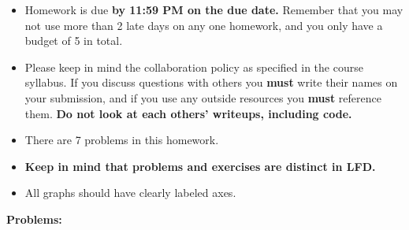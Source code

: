 \documentclass[11pt]{article}
\begin{document}
\begin{itemize}
\item Homework is due \textbf{by 11:59 PM on the due date.} Remember that
  you may not use more than 2 late days on any one homework, and you
  only have a budget of 5 in total.

\item Please keep in mind the collaboration policy as specified in the
  course syllabus. If you discuss questions with 
others you \textbf{must} write their names on your submission, and if
you use any outside resources you \textbf{must} reference
them. \textbf{Do not look at each others' writeups, including code.}

\item There are 7 problems in this homework. 
 \item \textbf{Keep in mind that problems and exercises are distinct
  in LFD.}

\item All graphs should have clearly labeled axes. 
\end{itemize}

\newpage 

\noindent \textbf{Problems:}
\end{document}
